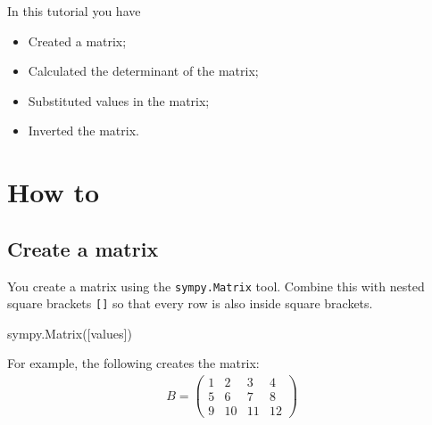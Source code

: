 \begin{note}
In this tutorial you have
\begin{itemize}
\item 

Created a matrix;

\item 

Calculated the determinant of the matrix;

\item 

Substituted values in the matrix;

\item 

Inverted the matrix.

\end{itemize}
\end{note}





\section{How to}
\label{\detokenize{tools-for-mathematics/04-matrices/how/main:how}}\label{\detokenize{tools-for-mathematics/04-matrices/how/main::doc}}

\subsection{Create a matrix}
\label{\detokenize{tools-for-mathematics/04-matrices/how/main:create-a-matrix}}

You create a matrix using the \texttt{sympy.Matrix} tool. Combine this with
nested square brackets \texttt{{[}{]}} so that every row is also inside square
brackets.


\begin{api}
sympy.Matrix([values])
\end{api}



For example, the following creates the matrix:
\begin{equation*}
\begin{split}
    B = \begin{pmatrix}
            1 & 2 & 3 & 4\\
            5 & 6 & 7 & 8\\
            9 & 10 & 11 & 12
        \end{pmatrix}
\end{split}
\end{equation*}



